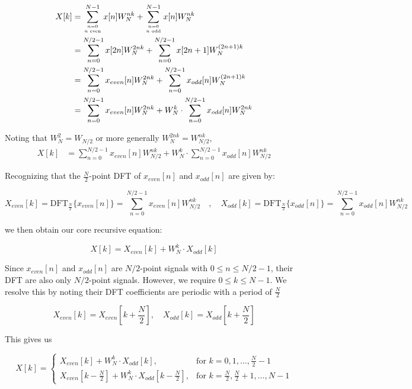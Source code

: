 \documentclass[8pt]{extarticle}
\begin{document}
\begin{align*}
X[k] &= \sum_{n=0 \atop n \text{ even}}^{N-1} x[n] W_N^{nk} + \sum_{n=0 \atop n \text{ odd}}^{N-1} x[n] W_N^{nk}\\
&= \sum_{n=0}^{N/2-1} x[2n] W_N^{2nk} + \sum_{n=0}^{N/2-1} x[2n + 1] W_N^{(2n+1)k}\\
&= \sum_{n=0}^{N/2-1} x_{even}[n] W_N^{2nk} + \sum_{n=0}^{N/2-1} x_{odd}[n] W_N^{(2n+1)k} \\
&= \sum_{n=0}^{N/2-1} x_{even}[n] W_N^{2nk} + W_N^{k} \cdot \sum_{n=0}^{N/2-1} x_{odd}[n] W_N^{2nk}\\
\end{align*}

Noting that $W_N^{2}=W_{N/2}$ or more generally $W_N^{2nk}=W_{N/2}^{nk}$,
\begin{align*}
X[k]&= \sum_{n=0}^{N/2-1} x_{even}[n] W_{N/2}^{nk} + W_N^{k} \cdot \sum_{n=0}^{N/2-1} x_{odd}[n] W_{N/2}^{nk}
\end{align*}

Recognizing that the $\frac{N}{2}$-point DFT of $x_{even}[n]$ and $x_{odd}[n]$ are given by:

\begin{equation*}
X_{even}[k] = \text{DFT}_{\frac{N}{2}}\{x_{even}[n]\} = \sum_{n=0}^{N/2-1} x_{even}[n] W_{N/2}^{nk} \quad , \quad X_{odd}[k] = \text{DFT}_{\frac{N}{2}}\{x_{odd}[n]\} = \sum_{n=0}^{N/2-1} x_{odd}[n] W_{N/2}^{nk}
\end{equation*}

we then obtain our core recursive equation:

\begin{equation}
    X[k] = X_{even}[k] + W_N^{k} \cdot X_{odd}[k]
    \label{eq:fft_int}
\end{equation}

Since $x_{even}[n]$ and $x_{odd}[n]$ are $N/2$-point signals with $ 0 \leq n \leq N/2-1$, their DFT are also only $N/2$-point signals. However, we require $0 \le k \le N-1$. We resolve this by noting their DFT coefficients are periodic with a period of $\frac{N}{2}$

\begin{equation*}
    X_{even}[k] = X_{even}\left[k + \frac{N}{2}\right], \quad X_{odd}[k] = X_{odd}\left[k + \frac{N}{2}\right]
\end{equation*}

This gives us

\begin{equation*}
    X[k] = 
    \begin{cases}
    X_{even}[k] + W_N^{k} \cdot X_{odd}[k], & \text{for } k = 0,1,\ldots,\frac{N}{2}-1 \\
    X_{even}\left[k-\frac{N}{2}\right] + W_N^{k} \cdot X_{odd}\left[k-\frac{N}{2}\right], & \text{for } k = \frac{N}{2},\frac{N}{2}+1,\ldots,N-1
\end{cases}
\end{equation*}
\end{document}
